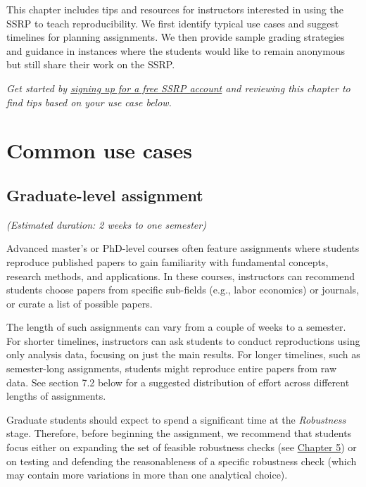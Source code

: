 \documentclass[
  openany]{book}
\begin{document}
This chapter includes tips and resources for instructors interested in using the SSRP to teach reproducibility. We first identify typical use cases and suggest timelines for planning assignments. We then provide sample grading strategies and guidance in instances where the students would like to remain anonymous but still share their work on the SSRP.

\emph{Get started by \href{https://www.socialsciencereproduction.org/users/sign_in}{signing up for a free SSRP account} and reviewing this chapter to find tips based on your use case below.}

\hypertarget{common-use-cases}{%
\section{Common use cases}\label{common-use-cases}}

\hypertarget{graduate-level-assignment}{%
\subsection{Graduate-level assignment}\label{graduate-level-assignment}}

\emph{(Estimated duration: 2 weeks to one semester)}

Advanced master's or PhD-level courses often feature assignments where students reproduce published papers to gain familiarity with fundamental concepts, research methods, and applications. In these courses, instructors can recommend students choose papers from specific sub-fields (e.g., labor economics) or journals, or curate a list of possible papers.

The length of such assignments can vary from a couple of weeks to a semester. For shorter timelines, instructors can ask students to conduct reproductions using only analysis data, focusing on just the main results. For longer timelines, such as semester-long assignments, students might reproduce entire papers from raw data. See section 7.2 below for a suggested distribution of effort across different lengths of assignments.

Graduate students should expect to spend a significant time at the \emph{Robustness} stage. Therefore, before beginning the assignment, we recommend that students focus either on expanding the set of feasible robustness checks (see \href{https://bitss.github.io/ACRE/robust.html}{Chapter 5}) or on testing and defending the reasonableness of a specific robustness check (which may contain more variations in more than one analytical choice).
\end{document}
